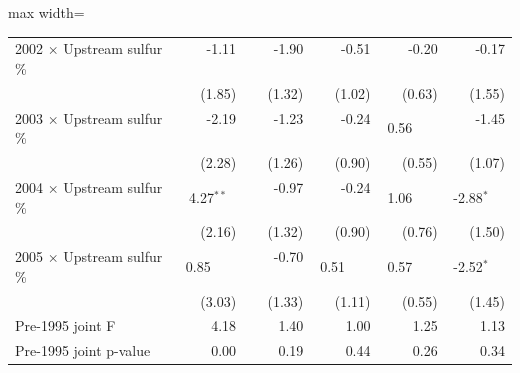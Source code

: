 \begin{table}[htbp]
{\begin{adjustbox}{max width=\linewidth}
\begin{tabular}{lrrrrr}
2002 $\times$ Upstream sulfur \% & \phantom{(}-1.11$^{\phantom{*}\phantom{*}\phantom{*}}$ & \phantom{(}-1.90$^{\phantom{*}\phantom{*}\phantom{*}}$ & \phantom{(}-0.51$^{\phantom{*}\phantom{*}\phantom{*}}$ & \phantom{(}-0.20$^{\phantom{*}\phantom{*}\phantom{*}}$ & \phantom{(}-0.17$^{\phantom{*}\phantom{*}\phantom{*}}$ \\
 & (\phantom{-}1.85)\phantom{$^{***}$} & (\phantom{-}1.32)\phantom{$^{***}$} & (\phantom{-}1.02)\phantom{$^{***}$} & (\phantom{-}0.63)\phantom{$^{***}$} & (\phantom{-}1.55)\phantom{$^{***}$} \\
2003 $\times$ Upstream sulfur \% & \phantom{(}-2.19$^{\phantom{*}\phantom{*}\phantom{*}}$ & \phantom{(}-1.23$^{\phantom{*}\phantom{*}\phantom{*}}$ & \phantom{(}-0.24$^{\phantom{*}\phantom{*}\phantom{*}}$ & \phantom{(}\phantom{-}0.56$^{\phantom{*}\phantom{*}\phantom{*}}$ & \phantom{(}-1.45$^{\phantom{*}\phantom{*}\phantom{*}}$ \\
 & (\phantom{-}2.28)\phantom{$^{***}$} & (\phantom{-}1.26)\phantom{$^{***}$} & (\phantom{-}0.90)\phantom{$^{***}$} & (\phantom{-}0.55)\phantom{$^{***}$} & (\phantom{-}1.07)\phantom{$^{***}$} \\
2004 $\times$ Upstream sulfur \% & \phantom{(}\phantom{-}4.27$^{**\phantom{*}}$ & \phantom{(}-0.97$^{\phantom{*}\phantom{*}\phantom{*}}$ & \phantom{(}-0.24$^{\phantom{*}\phantom{*}\phantom{*}}$ & \phantom{(}\phantom{-}1.06$^{\phantom{*}\phantom{*}\phantom{*}}$ & \phantom{(}-2.88$^{*\phantom{*}\phantom{*}}$ \\
 & (\phantom{-}2.16)\phantom{$^{***}$} & (\phantom{-}1.32)\phantom{$^{***}$} & (\phantom{-}0.90)\phantom{$^{***}$} & (\phantom{-}0.76)\phantom{$^{***}$} & (\phantom{-}1.50)\phantom{$^{***}$} \\
2005 $\times$ Upstream sulfur \% & \phantom{(}\phantom{-}0.85$^{\phantom{*}\phantom{*}\phantom{*}}$ & \phantom{(}-0.70$^{\phantom{*}\phantom{*}\phantom{*}}$ & \phantom{(}\phantom{-}0.51$^{\phantom{*}\phantom{*}\phantom{*}}$ & \phantom{(}\phantom{-}0.57$^{\phantom{*}\phantom{*}\phantom{*}}$ & \phantom{(}-2.52$^{*\phantom{*}\phantom{*}}$ \\
 & (\phantom{-}3.03)\phantom{$^{***}$} & (\phantom{-}1.33)\phantom{$^{***}$} & (\phantom{-}1.11)\phantom{$^{***}$} & (\phantom{-}0.55)\phantom{$^{***}$} & (\phantom{-}1.45)\phantom{$^{***}$} \\
\hline
Pre-1995 joint F & 4.18 & 1.40 & 1.00 & 1.25 & 1.13 \\
Pre-1995 joint p-value & 0.00 & 0.19 & 0.44 & 0.26 & 0.34 \\

\end{tabular}
\end{adjustbox}}
\end{table}
